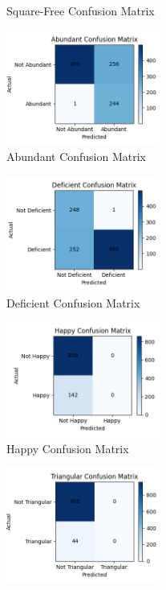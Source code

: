 \documentclass[twoside]{article}
\begin{document}
\begin{multicols}{2}
\begin{figure}[H]
    \caption{Square-Free Confusion Matrix}
\end{figure}
\begin{figure}[H]
    \centering
    \includegraphics[width=0.45\textwidth]{plots/abundant_confusion.png}
    \caption{Abundant Confusion Matrix}
\end{figure}
\begin{figure}[H]
    \centering
    \includegraphics[width=0.45\textwidth]{plots/deficient_confusion.png}
    \caption{Deficient Confusion Matrix}
\end{figure}
\begin{figure}[H]
    \centering
    \includegraphics[width=0.45\textwidth]{plots/happy_confusion.png}
    \caption{Happy Confusion Matrix}
\end{figure}
\begin{figure}[H]
    \centering
    \includegraphics[width=0.45\textwidth]{plots/triangular_confusion.png}

\end{figure}
\end{multicols}
\end{document}

